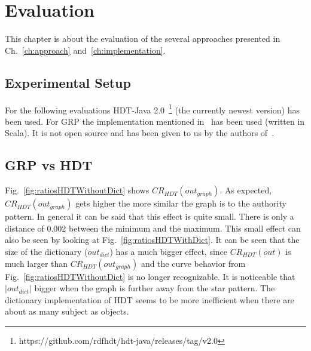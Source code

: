 \chapter{Evaluation}\label{ch:evaluation}

This chapter is about the evaluation of the several approaches presented in Ch.~\ref{ch:approach} and~\ref{ch:implementation}.

\section{Experimental Setup}

For the following evaluations HDT-Java 2.0~\footnote{\label{foot:1}https://github.com/rdfhdt/hdt-java/releases/tag/v2.0} (the currently newest version) has been used. For GRP the implementation mentioned in~\cite{maneth} has been used (written in Scala). It is not open source and has been given to us by the authors of~\cite{maneth}.

\section{GRP vs HDT}\label{sec:evaluationHDTvsGRP}

Fig.~\ref{fig:ratiosHDTWithoutDict} shows $CR_{HDT}(out_{graph})$. As expected, $CR_{HDT}(out_{graph})$ gets higher the more similar the graph is to the authority pattern. In general it can be said that this effect is quite small. There is only a distance of 0.002 between the minimum and the maximum. This small effect can also be seen by looking at Fig.~\ref{fig:ratiosHDTWithDict}. It can be seen that the size of the dictionary ($out_{dict}$) has a much bigger effect, since $CR_{HDT}(out)$ is much larger than $CR_{HDT}(out_{graph})$ and the curve behavior from Fig.~\ref{fig:ratiosHDTWithoutDict} is no longer recognizable. It is noticeable that $|out_{dict}|$ bigger when the graph is further away from the star pattern. The dictionary implementation of HDT seems to be more inefficient when there are about as many subject as objects. 


